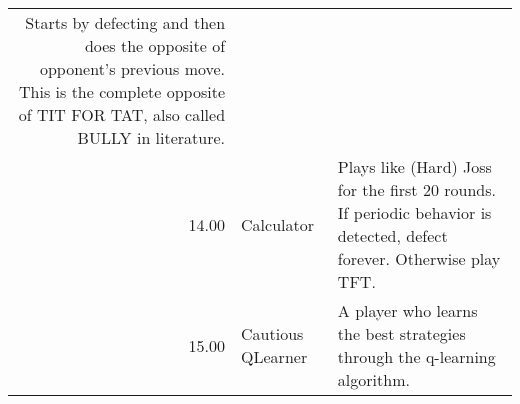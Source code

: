 \begin{table}[!hbtp]
\begin{adjustbox}{width=2\textwidth, angle=90}
\begin{tabular}{rll}
	Starts by defecting and then does the opposite of opponent's previous move.
	This is the complete opposite of TIT FOR TAT, also called BULLY in literature.                                                                                                                                                                                                                                                                                                                                                                                                                                                                                                                                                                                                                                                                                                                                                                                 \\
	14.00  & Calculator                  & Plays like (Hard) Joss for the first 20 rounds. If periodic behavior is
	detected, defect forever. Otherwise play TFT.                                                                                                                                                                                                                                                                                                                                                                                                                                                                                                                                                                                                                                                                                                                                                                                                                                                                                                \\
	15.00  & Cautious QLearner           & A player who learns the best strategies through the q-learning algorithm.


\end{tabular}
\end{adjustbox}
\end{table}
